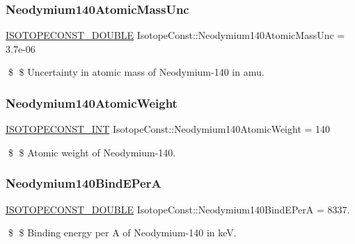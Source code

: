 \subsubsection{\texorpdfstring{Neodymium140\+Atomic\+Mass\+Unc}{Neodymium140AtomicMassUnc}}
{\footnotesize\ttfamily \mbox{\hyperlink{group___isotope_const-_macros_ga8f45a7272ce02c0b4c65c44636ed719a}{I\+S\+O\+T\+O\+P\+E\+C\+O\+N\+S\+T\+\_\+\+D\+O\+U\+B\+LE}} Isotope\+Const\+::\+Neodymium140\+Atomic\+Mass\+Unc = 3.\+7e-\/06}

\$ \$ Uncertainty in atomic mass of Neodymium-\/140 in amu. \mbox{\label{group___isotope_const-_neodymium-_nd140_ga1f9915e47ce5ee1128db420a1ddb6270}} 
\subsubsection{\texorpdfstring{Neodymium140\+Atomic\+Weight}{Neodymium140AtomicWeight}}
{\footnotesize\ttfamily \mbox{\hyperlink{group___isotope_const-_macros_ga5f18360b3e99483a35c32d789e62621c}{I\+S\+O\+T\+O\+P\+E\+C\+O\+N\+S\+T\+\_\+\+I\+NT}} Isotope\+Const\+::\+Neodymium140\+Atomic\+Weight = 140}

\$ \$ Atomic weight of Neodymium-\/140. \mbox{\label{group___isotope_const-_neodymium-_nd140_gade840fdd9c669331564bd3ded427d564}} 
\subsubsection{\texorpdfstring{Neodymium140\+Bind\+E\+PerA}{Neodymium140BindEPerA}}
{\footnotesize\ttfamily \mbox{\hyperlink{group___isotope_const-_macros_ga8f45a7272ce02c0b4c65c44636ed719a}{I\+S\+O\+T\+O\+P\+E\+C\+O\+N\+S\+T\+\_\+\+D\+O\+U\+B\+LE}} Isotope\+Const\+::\+Neodymium140\+Bind\+E\+PerA = 8337.}

\$ \$ Binding energy per A of Neodymium-\/140 in keV. \mbox{\label{group___isotope_const-_neodymium-_nd140_ga4d61a11b3749fdf262611bbf488fcf78}} 
